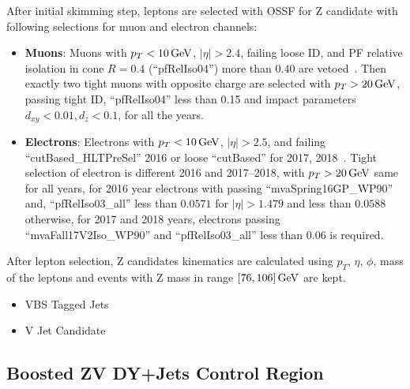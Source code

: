 After initial skimming step, leptons are selected with \gls{OSSF} for Z candidate
with following selections for muon and electron channels:
\begin{itemize}
  \item \textbf{Muons}: Muons with \( p_T < 10 \,\text{Ge\hspace{-.08em}V}{} \), \( |\eta| > 2.4 \),
        failing loose ID, and \gls{PF} relative isolation in cone \( R = 0.4 \) (``pfRelIso04'') more than
        \( 0.40 \) are vetoed~\cite{cms-muon-id}.
        Then exactly two tight muons with opposite charge are selected with \( p_T > 20 \,\text{Ge\hspace{-.08em}V}{} \), passing
        tight ID, ``pfRelIso04'' less than 0.15 and impact parameters \( d_{xy} < 0.01, d_z < 0.1 \),
        for all the years.
  \item \textbf{Electrons}: Electrons with \( p_T < 10 \,\text{Ge\hspace{-.08em}V}{} \), \( |\eta| > 2.5 \),
        and failing ``cutBased\_HLTPreSel'' 2016 or loose ``cutBased'' for 2017, 2018~\cite{cms-egamma-id}.
        Tight selection of electron is different 2016 and 2017--2018,
        with \( p_T > 20 \,\text{Ge\hspace{-.08em}V} \) same for all years, for 2016 year electrons with
        passing ``mvaSpring16GP\_WP90'' and, ``pfRelIso03\_all'' less than \( 0.0571 \) for
        \( |\eta| > 1.479 \) and less than \( 0.0588 \) otherwise,
        for 2017 and 2018 years, electrons passing ``mvaFall17V2Iso\_WP90'' and ``pfRelIso03\_all''
        less than \( 0.06 \) is required.
\end{itemize}

After lepton selection, Z candidates kinematics are calculated using \( p_T \), \( \eta \),
\( \phi \), mass of the leptons and events with Z mass in range \( [76, 106] \,\text{Ge\hspace{-.08em}V}{} \)
are kept.



\begin{itemize}
  \item VBS Tagged Jets
  \item V Jet Candidate
\end{itemize}

\subsection{
  Boosted ZV DY+Jets Control Region
}

